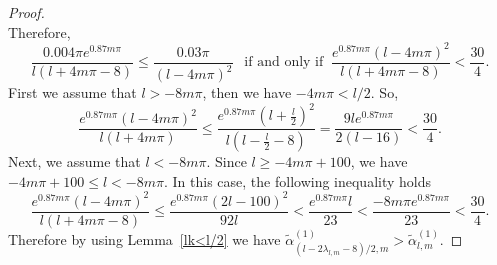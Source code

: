 \documentclass[12pt,reqno]{amsart}
\newcommand{\lemref}[1]{Lemma~\ref{#1}}
\begin{document}
\begin{proof}
$$ $$
Therefore,
 $$
 \frac{0.004\pi e^{0.87m\pi}}{l(l+4m\pi-8)}\le \frac{0.03\pi}{(l-4m\pi)^2}\ \  \text{  if and only if  }\  \frac{e^{0.87m\pi}(l-4m\pi)^2}{l(l+4m\pi-8)}<\frac{30}{4}.
 $$
 First we assume that $l>-8m\pi$, then we have $-4m\pi<l/2$. So,
 $$
 \frac{e^{0.87m\pi}(l-4m\pi)^2}{l(l+4m\pi)}\le \frac{e^{0.87m\pi}(l+\frac{l}{2})^2}{l(l-\frac{l}{2}-8)}=\frac{9le^{0.87m\pi}}{2(l-16)}<\frac{30}{4}.
 $$
Next, we assume that $l<-8m\pi$. Since $l\ge-4m\pi+100$, we have $-4m\pi+100\le l<-8m\pi$. In this case, the following inequality holds
$$
\frac{e^{0.87m\pi}(l-4m\pi)^2}{l(l+4m\pi-8)}\le \frac{e^{0.87m\pi}(2l-100)^2}{92l}<\frac{e^{0.87m\pi}l}{23}<\frac{-8m\pi e^{0.87m\pi}}{23}<\frac{30}{4}.
$$
  Therefore by using \lemref{lk<l/2} we have $\tilde\alpha_{(l-2\lambda_{l,m}-8)/2,m}^{(1)}>\tilde\alpha_{l,m}^{(1)}$.

\end{proof}
\end{document}
